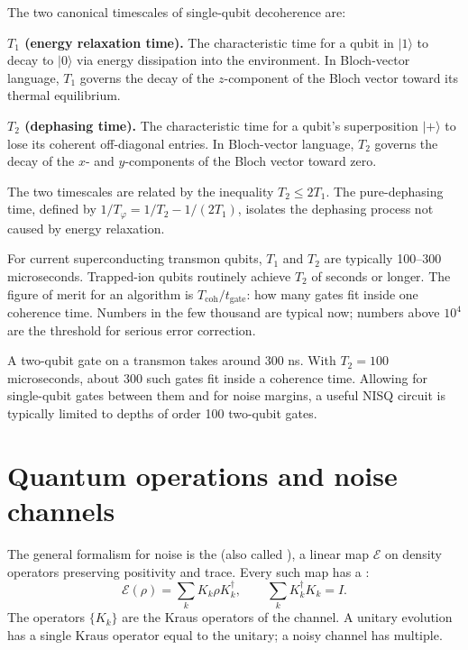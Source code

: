The two canonical timescales of single-qubit decoherence are:

\textbf{$T_1$ (energy relaxation time).} The characteristic time for a qubit in $|1\rangle$ to decay to $|0\rangle$ via energy dissipation into the environment. In Bloch-vector language, $T_1$ governs the decay of the $z$-component of the Bloch vector toward its thermal equilibrium.

\textbf{$T_2$ (dephasing time).} The characteristic time for a qubit's superposition $|+\rangle$ to lose its coherent off-diagonal entries. In Bloch-vector language, $T_2$ governs the decay of the $x$- and $y$-components of the Bloch vector toward zero.

The two timescales are related by the inequality $T_2 \leq 2T_1$. The pure-dephasing time, defined by $1/T_\varphi = 1/T_2 - 1/(2T_1)$, isolates the dephasing process not caused by energy relaxation.

For current superconducting transmon qubits, $T_1$ and $T_2$ are typically 100--300 microseconds. Trapped-ion qubits routinely achieve $T_2$ of seconds or longer. The figure of merit for an algorithm is $T_{\text{coh}}/t_{\text{gate}}$: how many gates fit inside one coherence time. Numbers in the few thousand are typical now; numbers above $10^4$ are the threshold for serious error correction.

\begin{example}
A two-qubit gate on a transmon takes around 300 ns. With $T_2 = 100$ microseconds, about 300 such gates fit inside a coherence time. Allowing for single-qubit gates between them and for noise margins, a useful NISQ circuit is typically limited to depths of order 100 two-qubit gates.
\end{example}

\section{Quantum operations and noise channels}

The general formalism for noise is the  (also called ), a linear map $\mathcal{E}$ on density operators preserving positivity and trace. Every such map has a :
\[
  \mathcal{E}(\rho) = \sum_k K_k \rho K_k^\dagger, \qquad \sum_k K_k^\dagger K_k = I.
\]
The operators $\{K_k\}$ are the Kraus operators of the channel. A unitary evolution has a single Kraus operator equal to the unitary; a noisy channel has multiple.

